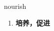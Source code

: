 
\begin{frame}
{\huge nourish}
\begin{center}
\begin{enumerate}\Large
  \item \textbf{培养，促进}
\end{enumerate}
\end{center}
\end{frame}
